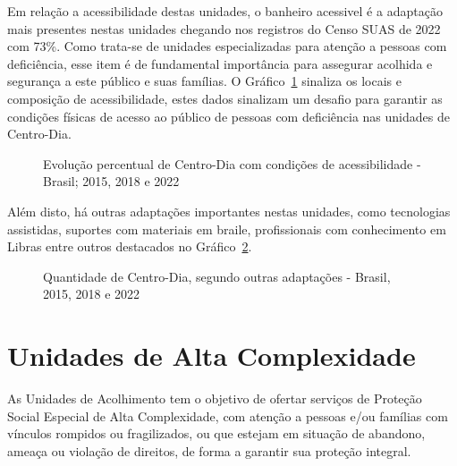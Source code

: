 \documentclass[
  letterpaper,
  DIV=11,
  numbers=noendperiod]{scrreprt}
\begin{document}
Em relação a acessibilidade destas unidades, o banheiro acessivel é a
adaptação mais presentes nestas unidades chegando nos registros do Censo
SUAS de 2022 com 73\%. Como trata-se de unidades especializadas para
atenção a pessoas com deficiência, esse item é de fundamental
importância para assegurar acolhida e segurança a este público e suas
famílias. O Gráfico~\ref{fig-cdia-acessibilidade} sinaliza os locais e
composição de acessibilidade, estes dados sinalizam um desafio para
garantir as condições físicas de acesso ao público de pessoas com
deficiência nas unidades de Centro-Dia.

\begin{figure}


\caption{\label{fig-cdia-acessibilidade}Evolução percentual de
Centro-Dia com condições de acessibilidade - Brasil; 2015, 2018 e 2022}

\end{figure}%

Além disto, há outras adaptações importantes nestas unidades, como
tecnologias assistidas, suportes com materiais em braile, profissionais
com conhecimento em Libras entre outros destacados no
Gráfico~\ref{fig-cdia_adaptacoes}.

\begin{figure}


\caption{\label{fig-cdia_adaptacoes}Quantidade de Centro-Dia, segundo
outras adaptações - Brasil, 2015, 2018 e 2022}

\end{figure}%

\section{Unidades de Alta
Complexidade}\label{unidades-de-alta-complexidade}

As Unidades de Acolhimento tem o objetivo de ofertar serviços de
Proteção Social Especial de Alta Complexidade, com atenção a pessoas
e/ou famílias com vínculos rompidos ou fragilizados, ou que estejam em
situação de abandono, ameaça ou violação de direitos, de forma a
garantir sua proteção integral.
\end{document}
